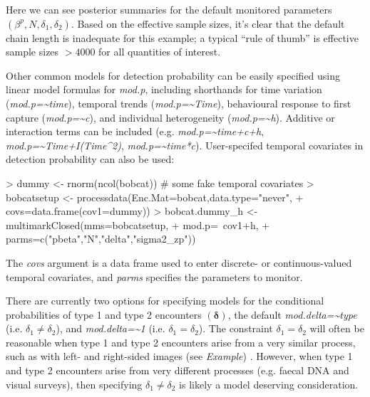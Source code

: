 \documentclass[12pt]{article}
\begin{document}
Here we can see posterior summaries for the default monitored parameters $(\beta^p, N, \delta_1, \delta_2)$. Based on the effective sample sizes, it's clear that the default chain length is inadequate for this example; a typical ``rule of thumb'' is effective sample sizes $>4000$ for all quantities of interest.

Other common models for detection probability can be easily specified using linear model formulas for \textit{mod.p}, including shorthands for time variation (\textit{mod.p={\~{}}time}), temporal trends (\textit{mod.p={\~{}}Time}), behavioural response to first capture (\textit{mod.p={\~{}}c}), and individual heterogeneity (\textit{mod.p={\~{}}h}). Additive or interaction terms can be included (e.g. \textit{mod.p={\~{}}time+c+h}, \textit{mod.p=\~{}Time+I(Time\^{}2)}, \textit{mod.p={\~{}}time*c}). User-specifed temporal covariates in detection probability can also be used: 
\begin{Schunk}
\begin{Sinput}
> dummy <- rnorm(ncol(bobcat)) # some fake temporal covariates
> bobcatsetup <- processdata(Enc.Mat=bobcat,data.type="never",
+                     covs=data.frame(cov1=dummy))
> bobcat.dummy_h <- multimarkClosed(mms=bobcatsetup,
+                     mod.p=~cov1+h,
+                     parms=c("pbeta","N","delta","sigma2_zp"))
\end{Sinput}
\end{Schunk}
The \textit{covs} argument is a data frame used to enter discrete- or continuous-valued temporal covariates, and \textit{parms} specifies the parameters to monitor. 

There are currently two options for specifying models for the conditional probabilities of type 1 and type 2 encounters $({\boldsymbol \delta})$, the default \textit{mod.delta={\~{}}type} (i.e. $\delta_1 \ne \delta_2$), and \textit{mod.delta={\~{}}1} (i.e. $\delta_1 = \delta_2$). The constraint $\delta_1 = \delta_2$ will often be reasonable when type 1 and type 2 encounters arise from a very similar process, such as with left- and right-sided images (see \textit{Example}) . However, when type 1 and type 2 encounters arise from very different processes (e.g. faecal DNA and visual surveys), then specifying $\delta_1 \ne \delta_2$ is likely a model deserving consideration.  
\end{document}
